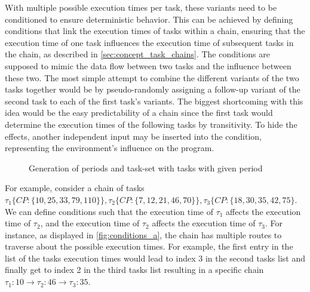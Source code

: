 With multiple possible execution times per task, these variants need to be conditioned to ensure deterministic behavior.
This can be achieved by defining conditions that link the execution times of tasks within a chain, ensuring that the execution time of one task influences the execution time of subsequent tasks in the chain, as described in \cref{sec:concept_task_chains}.
The conditions are supposed to mimic the data flow between two tasks and the influence between these two.
The most simple attempt to combine the different variants of the two tasks together would be by pseudo-randomly assigning a follow-up variant of the second task to each of the first task's variants.
The biggest shortcoming with this idea would be the easy predictability of a chain since the first task would determine the execution times of the following tasks by transitivity.
To hide the effects, another independent input may be inserted into the condition, representing the environment's influence on the program.


\begin{figure}[ht]
    \resizebox{\textwidth}{!}{%
      \label{fig:conditions_a}
      
 }
  \caption{Generation of periods and task-set with tasks with given period}
\end{figure}

For example, consider a chain of tasks \( \tau_1 \{ CP: \{10,25,33,79,110\}\}, \tau_2 \{ CP: \{7,12,21,46,70\}\}, \tau_3 \{CP: \{18,30,35,42,75\} \).
We can define conditions such that the execution time of \( \tau_1 \) affects the execution time of \( \tau_2 \), and the execution time of \( \tau_2 \) affects the execution time of \( \tau_3 \). 
For instance, as displayed in \cref{fig:conditions_a}, the chain has multiple routes to traverse about the possible execution times.
For example, the first entry in the list of the tasks execution times would lead to index 3 in the second tasks list and finally get to index 2 in the third tasks list resulting in a specific chain \( \tau_1: 10 \rightarrow \tau_2: 46 \rightarrow \tau_3: 35 \).


